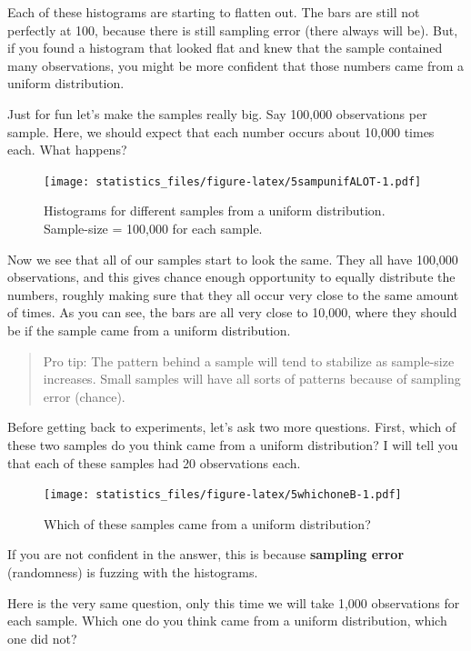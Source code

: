\documentclass[]{book}
\begin{document}
Each of these histograms are starting to flatten out. The bars are still not perfectly at 100, because there is still sampling error (there always will be). But, if you found a histogram that looked flat and knew that the sample contained many observations, you might be more confident that those numbers came from a uniform distribution.

Just for fun let's make the samples really big. Say 100,000 observations per sample. Here, we should expect that each number occurs about 10,000 times each. What happens?

\begin{figure}
\centering
\texttt{[image: statistics\_files/figure-latex/5sampunifALOT-1.pdf]}
\caption{\label{fig:5sampunifALOT}Histograms for different samples from a uniform distribution. Sample-size = 100,000 for each sample.}
\end{figure}

Now we see that all of our samples start to look the same. They all have 100,000 observations, and this gives chance enough opportunity to equally distribute the numbers, roughly making sure that they all occur very close to the same amount of times. As you can see, the bars are all very close to 10,000, where they should be if the sample came from a uniform distribution.

\begin{quote}
Pro tip: The pattern behind a sample will tend to stabilize as sample-size increases. Small samples will have all sorts of patterns because of sampling error (chance).
\end{quote}

Before getting back to experiments, let's ask two more questions. First, which of these two samples do you think came from a uniform distribution? I will tell you that each of these samples had 20 observations each.

\begin{figure}
\centering
\texttt{[image: statistics\_files/figure-latex/5whichoneB-1.pdf]}
\caption{\label{fig:5whichoneB}Which of these samples came from a uniform distribution?}
\end{figure}

If you are not confident in the answer, this is because \textbf{sampling error} (randomness) is fuzzing with the histograms.

Here is the very same question, only this time we will take 1,000 observations for each sample. Which one do you think came from a uniform distribution, which one did not?
\end{document}
